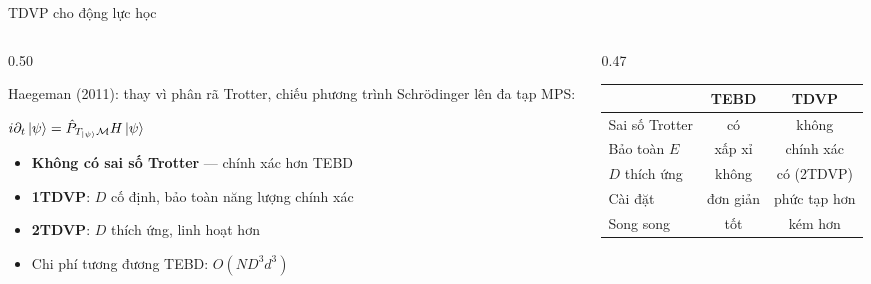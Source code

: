 \documentclass[aspectratio=169, 11pt]{beamer}
\newcommand{\good}[1]{\textcolor{qgreen}{#1}}
\newcommand{\eqn}[1]{\begin{center}\colorbox{eqbox}{\color{qcyan}$\displaystyle #1$}\end{center}}
\begin{document}
\begin{frame}{TDVP cho động lực học}

\begin{columns}[T]
\begin{column}{0.50\textwidth}

{\small Haegeman (2011): thay vì phân rã Trotter, chiếu phương trình Schrödinger lên đa tạp MPS:}
\eqn{i\partial_t\ket{\psi}=\hat{P}_{T_{\ket{\psi}}\mathcal{M}}H\ket{\psi}}

\vspace{4pt}
{\small
\begin{itemize}
  \item \textbf{Không có sai số Trotter} — chính xác hơn TEBD
  \item \textbf{1TDVP}: $D$ cố định, bảo toàn năng lượng chính xác
  \item \textbf{2TDVP}: $D$ thích ứng, linh hoạt hơn
  \item Chi phí tương đương TEBD: $O(ND^3 d^3)$
\end{itemize}}

\end{column}
\begin{column}{0.47\textwidth}

\vspace{6pt}
{\small
\renewcommand{\arraystretch}{1.4}
\begin{tabular}{@{}lcc@{}}
\toprule
& \textbf{TEBD} & \textbf{TDVP} \\
\midrule
Sai số Trotter & có & \good{không} \\
Bảo toàn $E$ & xấp xỉ & \good{chính xác} \\
$D$ thích ứng & không & \good{có (2TDVP)} \\
Cài đặt & đơn giản & phức tạp hơn \\
Song song & \good{tốt} & kém hơn \\
\bottomrule
\end{tabular}}

\end{column}
\end{columns}

\end{frame}
\end{document}
